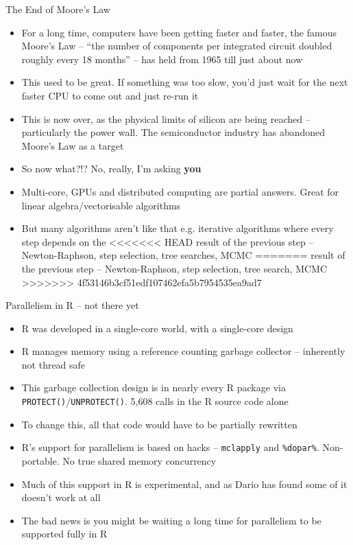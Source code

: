 \documentclass{beamer}
\begin{document}
\begin{frame}{The End of Moore's Law}
\begin{itemize}
\item For a long time, computers have been getting faster and faster, the famous
			Moore's Law -- ``the number of components per integrated circuit doubled roughly every 18 months'' -- 
			has held from 1965 till just about now
\item This used to be great. If something was too slow, you'd just wait for the next faster CPU to come out
			and just re-run it
\item This is now over, as the physical limits of silicon are being reached -- particularly the power wall. 
			The semiconductor industry has abandoned Moore's Law as a target
\item So now what?!? No, really, I'm asking \textbf{you}
\item Multi-core, GPUs and distributed computing are partial answers. Great for
			linear algebra/vectorisable algorithms
\item But many algorithms aren't like that e.g. iterative algorithms where every step depends on the 
<<<<<<< HEAD
			result of the previous step -- Newton-Raphson, step selection, tree searches, MCMC
=======
			result of the previous step -- Newton-Raphson, step selection, tree search, MCMC
>>>>>>> 4f53146b3cf51edf107462efa5b7954535ea9ad7
\end{itemize}
\end{frame}

\begin{frame}{Parallelism in R -- not there yet}
\begin{itemize}
\item R was developed in a single-core world, with a single-core design
\item R manages memory using a reference counting garbage collector -- inherently
			not thread safe
\item This garbage collection design is in nearly every R package via
			\texttt{PROTECT()}/\texttt{UNPROTECT()}. 5,608 calls in the R source code alone
\item To change this, all that code would have to be partially rewritten
\item R's support for parallelism is based on hacks -- \texttt{mclapply} and \texttt{\%dopar\%}.
			Non-portable. No true shared memory concurrency
\item Much of this support in R is experimental, and as Dario has found some of it doesn't work at all
\item The bad news is you might be waiting a long time for parallelism to be supported fully in R
\end{itemize}
\end{frame}
\end{document}
